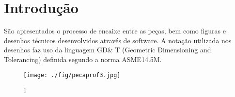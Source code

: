 \section{Introdução}

São apresentados o processo de encaixe entre as peças, bem como figuras e desenhos técnicos desenvolvidos através de software. A notação utilizada nos desenhos faz uso da linguagem GD\& T (Geometric Dimensioning and Tolerancing) definida segundo a norma ASME14.5M.
\begin{figure}[h]
\begin{center}
\texttt{[image: ./fig/pecaprof3.jpg]}
\caption{\label{fig:1}1} 
\end{center}
\end{figure}